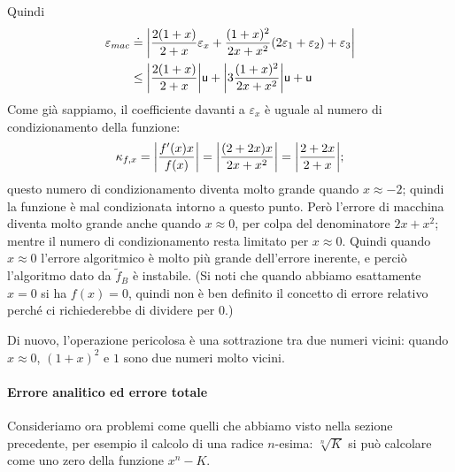 \documentclass[a4paper]{report}
\DeclarePairedDelimiter{\abs}{\lvert}{\rvert}
\theoremstyle{definition}
\theoremstyle{remark}
\begin{document}
Quindi
\begin{align*}
    \varepsilon_{mac} &\doteq \abs*{\frac{2(1+x)}{2+x}\varepsilon_x + \frac{(1+x)^2}{2x+x^2}(2\varepsilon_1+\varepsilon_2) +\varepsilon_3} \\
    &\leq \abs*{\frac{2(1+x)}{2+x}}\mathsf{u} + \abs*{3\frac{(1+x)^2}{2x+x^2}}\mathsf{u} + \mathsf{u}
\end{align*}
Come già sappiamo, il coefficiente davanti a $\varepsilon_x$ è uguale al numero di condizionamento della funzione:
\[
\kappa_{f,x} = \abs*{\frac{f'(x) x}{f(x)}} = \abs*{\frac{(2+2x)x}{2x+x^2}} = \abs*{\frac{2+2x}{2+x}};
\]
questo numero di condizionamento diventa molto grande quando $x\approx -2$; quindi la funzione è mal condizionata intorno a questo punto. Però l'errore di macchina diventa molto grande anche quando $x\approx 0$, per colpa del denominatore $2x+x^2$; mentre il numero di condizionamento resta limitato per $x\approx 0$. Quindi quando $x\approx 0$ l'errore algoritmico è molto più grande dell'errore inerente, e perciò l'algoritmo dato da $\tilde{f}_B$ è instabile. (Si noti che quando abbiamo esattamente $x=0$ si ha $f(x)=0$, quindi non è ben definito il concetto di errore relativo perché ci richiederebbe di dividere per $0$.)

Di nuovo, l'operazione pericolosa è una sottrazione tra due numeri vicini: quando $x\approx 0$, $(1+x)^2$ e $1$ sono due numeri molto vicini.

\paragraph{Errore analitico ed errore totale}
Consideriamo ora problemi come quelli che abbiamo visto nella sezione precedente, per esempio il calcolo di una radice $n$-esima: $\sqrt[n]{K}$ si può calcolare come uno zero della funzione $x^n - K$.
\end{document}
